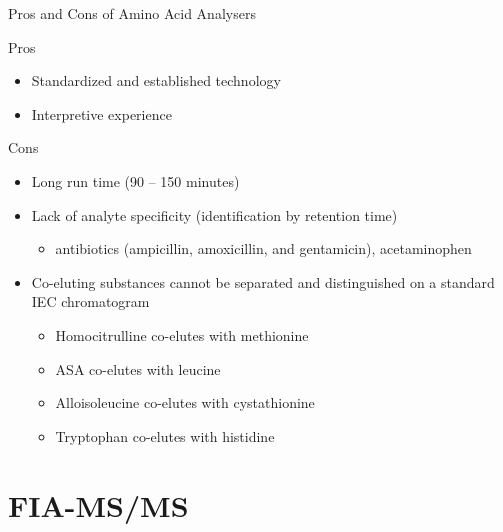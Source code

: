 \documentclass[presentation, smaller]{beamer}
\begin{document}
\begin{frame}[label={sec:orgheadline15}]{Pros and Cons of Amino Acid Analysers}
\begin{block}{Pros}
\begin{itemize}
\item Standardized and established technology
\item Interpretive experience
\end{itemize}
\end{block}
\begin{block}{Cons}
\begin{itemize}
\item Long run time (90 – 150 minutes)
\item Lack of analyte specificity (identification by retention time)
\begin{itemize}
\item antibiotics (ampicillin, amoxicillin, and gentamicin), acetaminophen
\end{itemize}
\item Co-eluting substances cannot be separated and distinguished on a standard IEC chromatogram
\begin{itemize}
\item Homocitrulline co-elutes with methionine
\item ASA co-elutes with leucine
\item Alloisoleucine co-elutes with cystathionine
\item Tryptophan co-elutes with histidine
\end{itemize}
\end{itemize}
\end{block}
\end{frame}

\section{FIA-MS/MS}
\label{sec:orgheadline23}
\end{document}
